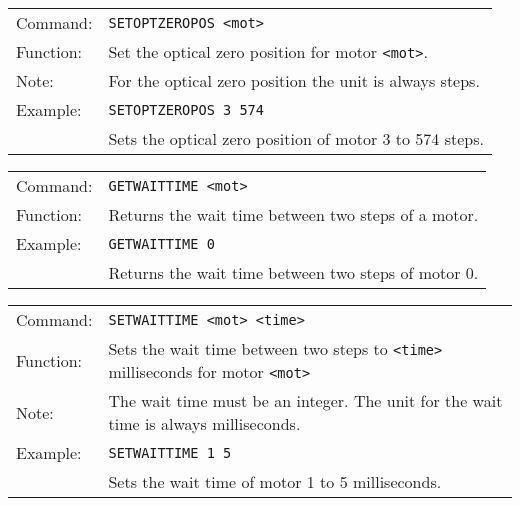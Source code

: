 \vspace{\vdistace}

\begin{table}[h]
  \begin{tabularx}{\textwidth}{lX}
    Command:  & \texttt{SETOPTZEROPOS <mot>}\\
    Function: & Set the optical zero position for motor \texttt{<mot>}.\\
    Note:     & For the optical zero position the unit is always steps.\\
    Example:  & \texttt{SETOPTZEROPOS 3 574}\\
              & Sets the optical zero position of motor 3 to 574 steps.
  \end{tabularx}
\end{table}

\vspace{\vdistace}

\begin{table}[h]
  \begin{tabularx}{\textwidth}{lX}
    Command:  & \texttt{GETWAITTIME <mot>}\\
    Function: & Returns the wait time between two steps of a motor.\\
    Example:  & \texttt{GETWAITTIME 0}\\
              & Returns the wait time between two steps of motor 0.
  \end{tabularx}
\end{table}

\vspace{\vdistace}

\begin{table}[h]
  \begin{tabularx}{\textwidth}{lX}
    Command:  & \texttt{SETWAITTIME <mot> <time>}\\
    Function: & Sets the wait time between two steps to \texttt{<time>} milliseconds
                for motor \texttt{<mot>}\\
    Note:     & The wait time must be an integer. The unit for the wait time
                is always milliseconds.\\
    Example:  & \texttt{SETWAITTIME 1 5}\\
              & Sets the wait time of motor 1 to 5 milliseconds.
  \end{tabularx}
\end{table}

\vspace{\vdistace}

